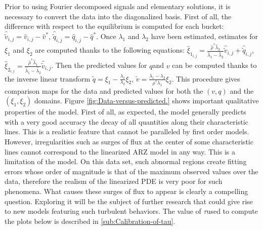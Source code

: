 \documentclass[preprint]{elsarticle}
\begin{document}
Prior to using Fourier decomposed signals and elementary solutions,
it is necessary to convert the data into the diagonalized basis. First
of all, the difference with respect to the equilibrium is computed
for each bucket: $\widehat{\widetilde{v}}_{i,j}=\widehat{v}_{i,j}-\widehat{v}^{*}$,
$\widehat{\widetilde{q}}_{i,j}=\widehat{q}_{i,j}-\widehat{q}^{*}$.
Once $\lambda_{1}$ and $\lambda_{2}$ have been estimated, estimates
for $\xi_{1}$ and $\xi_{2}$ are computed thanks to the following
equations: $\widehat{\xi}_{1_{i,j}}=\frac{\widehat{\rho}^{*}\widehat{\lambda}_{2}}{\widehat{\lambda}_{1}-\widehat{\lambda}_{2}}\widehat{\widetilde{v}}_{i,j}+\widehat{\widetilde{q}}_{i,j}$,
$\widehat{\xi}_{2_{i,j}}=\frac{\widehat{\rho}^{*}\widehat{\lambda}_{1}}{\widehat{\lambda}_{1}-\widehat{\lambda}_{2}}\widehat{\widetilde{v}}_{i,j}$.
Then the predicted values for $q$and $v$ can be computed thanks
to the inverse linear transform $\widetilde{q}=\xi_{1}-\frac{\lambda_{1}}{\lambda_{2}}\xi_{2}$,
$\widetilde{v}=\frac{\lambda_{1}-\lambda_{2}}{\rho^{*}\lambda_{1}}\xi_{2}$.
This procedure gives comparison maps for the data and predicted values
for both the $\left(v,q\right)$ and the $\left(\xi_{1},\xi_{2}\right)$
domains. Figure \ref{fig:Data-versus-predicted.} shows important
qualitative properties of the model. First of all, as expected, the
model generally predicts with a very good accuracy the decay of all
quantities along their characteristic lines. This is a realistic feature
that cannot be paralleled by first order models. However, irregularities
such as surges of flux at the center of some characteristic lines
cannot correspond to the linearized ARZ model in any way. This is
a limitation of the model. On this data set, such abnormal regions
create fitting errors whose order of magnitude is that of the maximum
observed values over the data, therefore the realism of the linearized
PDE is very poor for such phenomena. What causes these surges of flux
to appear is clearly a compelling question. Exploring it will be the
subject of further research that could give rise to new models featuring
such turbulent behaviors. The value of $\tau$used to compute the
plots below is described in \ref{sub:Calibration-of-tau}.
\end{document}
